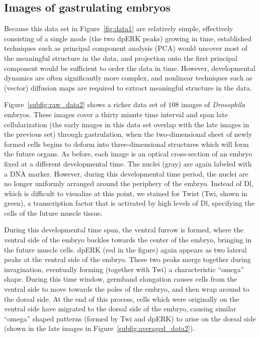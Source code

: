 \documentclass{pnastwo}
\begin{document}
\begin{article}
%

\subsection{Images of gastrulating embryos}

%
Because this data set in Figure~\ref{fig:data1} are relatively simple, effectively consisting of a single mode (the two dpERK peaks) growing in time,
established techniques such as principal component analysis (PCA) \cite{shlens2005tutorial} would uncover most of the meaningful structure in the data, and projection onto the first principal component would be sufficient to order the data in time.
%
However, developmental dynamics are often significantly more complex, and nonlinear techniques such as (vector) diffusion maps are required to extract meaningful structure in the data.
%

Figure~\ref{subfig:raw_data2} shows a richer data set of $108$ images of {\it Drosophila} embryos.
%
These images cover a thirty minute time interval and span late cellularization (the early images in this data set overlap with the late images in the previous set) through gastrulation, when the two-dimensional sheet of newly formed cells begins to deform into three-dimensional structures which will form the future organs.
%
As before, each image is an optical cross-section of an embryo fixed at a different developmental time.
%
The nuclei (gray) are again labeled with a DNA marker.
%
However, during this developmental time period, the nuclei are no longer uniformly arranged around the periphery of the embryo.
%
Instead of Dl, which is difficult to visualize at this point, we stained for Twist (Twi, shown in green), a transcription factor that is activated by high levels of Dl, specifying the cells of the future muscle tissue.
%

%
During this developmental time span, the ventral furrow is formed, where the ventral side of the embryo buckles towards the center of the embryo, bringing in the future muscle cells.
%
dpERK (red in the figure) again appears as two lateral peaks at the ventral side of the embryo.
%
These two peaks merge together during invagination, eventually forming (together with Twi) a characteristic ``omega'' shape.
%
During this time window, germband elongation causes cells from the ventral side to move towards the poles of the embryo, and then wrap around to the dorsal side.
%
At the end of this process, cells which were originally on the ventral side have migrated to the dorsal side of the embryo, causing similar ``omega'' shaped patterns (formed by Twi and dpERK) to arise on the dorsal side (shown in the late images in Figure~\ref{subfig:averaged_data2}).


\end{article}
\end{document}
